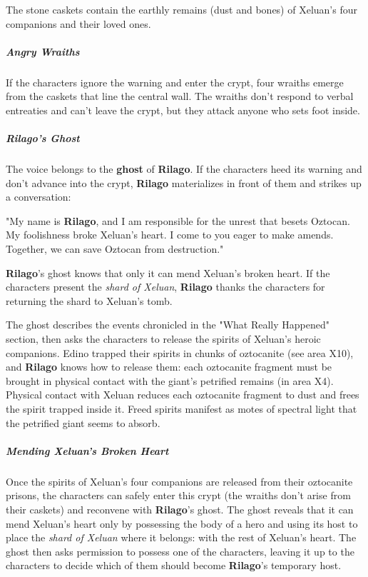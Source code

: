 \documentclass[10pt,a4paper,twoside,bg=print,twocolumn,openany,nodeprecatedcode]{dndbook}
\begin{document}
The stone caskets contain the earthly remains (dust and bones) of Xeluan's four companions and their loved ones.

\subparagraph{Angry Wraiths}
If the characters ignore the warning and enter the crypt, four wraiths emerge from the caskets that line the central wall. The wraiths don't respond to verbal entreaties and can't leave the crypt, but they attack anyone who sets foot inside.

\subparagraph{Rilago's Ghost}
The voice belongs to the \textbf{ghost} of \textbf{Rilago}. If the characters heed its warning and don't advance into the crypt, \textbf{Rilago} materializes in front of them and strikes up a conversation:

\begin{DndReadAloud}{}
"My name is \textbf{Rilago}, and I am responsible for the unrest that besets Oztocan. My foolishness broke Xeluan's heart. I come to you eager to make amends. Together, we can save Oztocan from destruction."

\end{DndReadAloud}

\textbf{Rilago}'s ghost knows that only it can mend Xeluan's broken heart. If the characters present the \textit{shard of Xeluan}, \textbf{Rilago} thanks the characters for returning the shard to Xeluan's tomb.

The ghost describes the events chronicled in the "What Really Happened" section, then asks the characters to release the spirits of Xeluan's heroic companions. Edino trapped their spirits in chunks of oztocanite (see area X10), and \textbf{Rilago} knows how to release them: each oztocanite fragment must be brought in physical contact with the giant's petrified remains (in area X4). Physical contact with Xeluan reduces each oztocanite fragment to dust and frees the spirit trapped inside it. Freed spirits manifest as motes of spectral light that the petrified giant seems to absorb.

\subparagraph{Mending Xeluan's Broken Heart}
Once the spirits of Xeluan's four companions are released from their oztocanite prisons, the characters can safely enter this crypt (the wraiths don't arise from their caskets) and reconvene with \textbf{Rilago}'s ghost. The ghost reveals that it can mend Xeluan's heart only by possessing the body of a hero and using its host to place the \textit{shard of Xeluan} where it belongs: with the rest of Xeluan's heart. The ghost then asks permission to possess one of the characters, leaving it up to the characters to decide which of them should become \textbf{Rilago}'s temporary host.
\end{document}
